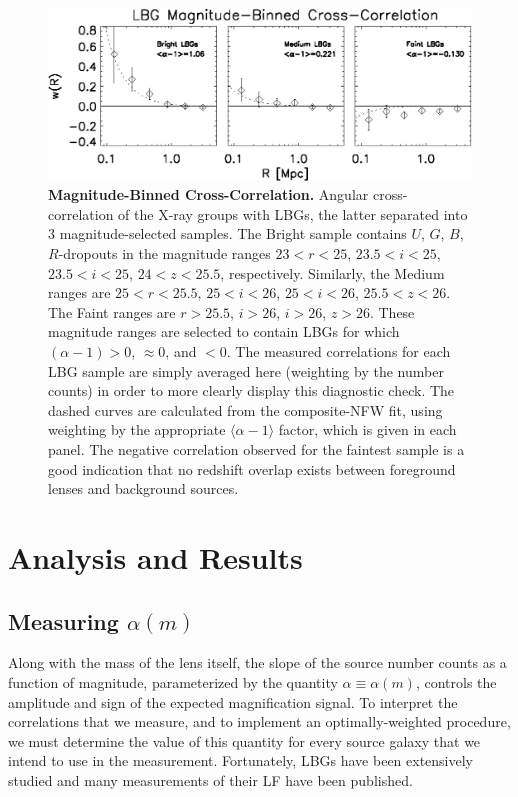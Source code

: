\begin{figure}
\begin{center}
\includegraphics[scale=1.2]{plots_ch2/magbinnedLBGs_multiNFWfit.eps}
\caption[Magnitude-Binned Cross-Correlation]{{\bf Magnitude-Binned Cross-Correlation.} Angular cross-correlation of the X-ray groups with \ac{LBG}s, the latter separated into 3 magnitude-selected samples.  The Bright sample contains $U$, $G$, $B$, $R$-dropouts in the magnitude ranges $23<r<25$, $23.5<i<25$,  $23.5<i<25$,  $24<z<25.5$, respectively. Similarly, the Medium ranges are $25<r<25.5$, $25<i<26$,  $25<i<26$,  $25.5<z<26$.  The Faint ranges are $r>25.5$, $i>26$,  $i>26$,  $z>26$. These magnitude ranges are selected to contain \ac{LBG}s for which $(\alpha-1)>0$, $\approx 0$, and $<0$.  The measured correlations for each \ac{LBG} sample are simply averaged here (weighting by the number counts) in order to more clearly display this diagnostic check. The dashed curves are calculated from the composite-\ac{NFW} fit, using weighting by the appropriate $\langle \alpha -1 \rangle$ factor, which is given in each panel. The negative correlation observed for the faintest sample is a good indication that no redshift overlap exists between foreground lenses and background sources.}
\label{plot:MagBinned2}
\end{center}
\end{figure}

\section{Analysis and Results}
\label{sec:results2}
\subsection{Measuring $\alpha(m)$}
\label{sec:alpha}
Along with the mass of the lens itself, the slope of the source number counts as a function of magnitude, parameterized by the quantity $\alpha \equiv \alpha(m)$, controls the amplitude and sign of the expected magnification signal.  To interpret the correlations that we measure, and to implement an optimally-weighted procedure, we must determine the value of this quantity for every source galaxy that we intend to use in the measurement.  Fortunately, \ac{LBG}s have been extensively studied and many measurements of their \ac{LF} have been published.  

